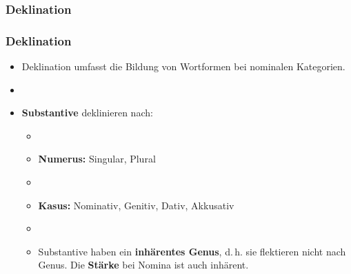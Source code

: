 
\subsubsection{Deklination}



\begin{frame}
\frametitle{Deklination}

\begin{itemize}
\item Deklination umfasst die Bildung von Wortformen bei nominalen Kategorien.
\item[]
\item \textbf{Substantive} deklinieren nach:

\begin{itemize}
\item[]
\item \textbf{Numerus:} Singular, Plural
\item[]
\item \textbf{Kasus:} Nominativ, Genitiv, Dativ, Akkusativ
\item[]
\item Substantive haben ein \textbf{inhärentes Genus}, d.\,h. sie flektieren nicht nach Genus. Die \textbf{Stärke} bei Nomina ist auch inhärent.
\end{itemize}

\end{itemize}

\end{frame}




